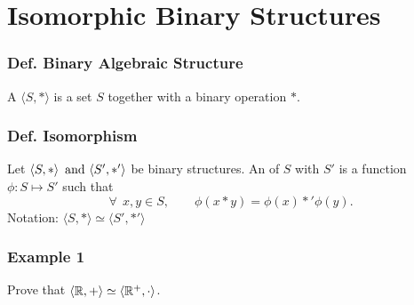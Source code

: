 \section{Isomorphic Binary Structures}

\subsubsection{Def. Binary Algebraic Structure}
A  $\langle S,*\rangle$ is a set $S$ together with a binary operation $*$.

\subsubsection{Def. Isomorphism}
Let $\langle S,*\rangle \operatorname{~\text{and}~} \langle S',*' \rangle$ be binary structures. An  of $S$ with $S'$ is a  function $\phi: S \mapsto S'$ such that
\[
    \forall~~ x,y \in S, \qquad \phi(x*y) = \phi(x) *' \phi(y).
\]
Notation: $\langle S,*\rangle \simeq \langle S',*'\rangle$

\subsubsection*{Example 1}
Prove that $\langle \mathbb{R},+\rangle \simeq \langle \mathbb{R}^+, \cdot \rangle$.


